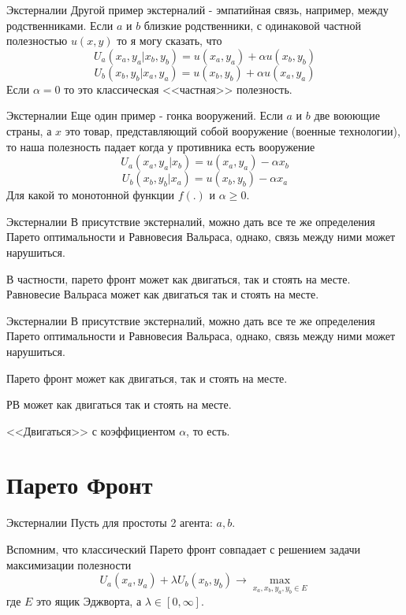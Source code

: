 \documentclass{beamer}
\begin{document}
\begin{frame}{Экстерналии}
Другой пример экстерналий - \alert{эмпатийная связь}, например, между родственниками. Если $a$ и $b$ близкие родственники, с одинаковой частной полезностью $u(x,y)$ то я могу сказать, что
$$U_a(x_a, y_a | x_b, y_b) = u(x_a, y_a) + \alpha u(x_b, y_b)$$
$$U_b(x_b, y_b | x_a, y_a) = u(x_b, y_b) + \alpha u(x_a, y_a)$$
Если $\alpha = 0$ то это классическая <<частная>> полезность.
\end{frame}

\begin{frame}{Экстерналии}
Еще один пример - \alert{гонка вооружений}. Если $a$ и $b$ две воюющие страны, а $x$ это товар, представляющий собой вооружение (военные технологии), то наша полезность падает когда у противника есть вооружение
$$U_a(x_a, y_a | x_b) = u(x_a, y_a) - \alpha x_b$$
$$U_b(x_b, y_b | x_a) = u(x_b, y_b) - \alpha x_a$$
Для какой то монотонной функции $f(.)$ и $\alpha \geqslant 0$.
\end{frame}

\begin{frame}{Экстерналии}
В присутствие экстерналий, можно дать все те же определения Парето оптимальности и Равновесия Вальраса, однако, связь между ними может нарушиться.

В частности, парето фронт может как двигаться, так и стоять на месте. Равновесие Вальраса может как двигаться так и стоять на месте.
\end{frame}

\begin{frame}{Экстерналии}
В присутствие экстерналий, можно дать все те же определения Парето оптимальности и Равновесия Вальраса, однако, связь между ними может нарушиться.

Парето фронт может как двигаться, так и стоять на месте. 

РВ может как двигаться так и стоять на месте.

<<Двигаться>> с коэффициентом $\alpha$, то есть.
\end{frame}

\section{Парето Фронт}

\begin{frame}{Экстерналии}
Пусть для простоты 2 агента: $a,b$. 

Вспомним, что классический Парето фронт совпадает с решением задачи максимизации полезности
$$ U_a(x_a, y_a) + \lambda U_b(x_b,y_b) \to \max_{x_a,x_b,y_a,y_b \in E}$$
где $E$ это ящик Эджворта, а $\lambda \in [0, \infty]$. 
\end{frame}
\end{document}
